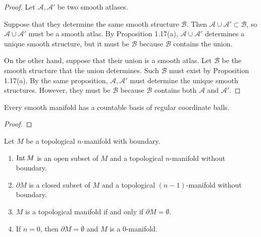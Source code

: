 \begin{proof}
  Let $\mathcal{A}, \mathcal{A}'$ be two smooth atlases.

  Suppose that they determine the same smooth structure $\mathcal{B}$.
  Then $\mathcal{A} \cup \mathcal{A}' \subset \mathcal{B}$, so $\mathcal{A} \cup \mathcal{A}'$ must be a smooth atlas.
  By Proposition 1.17(a), $\mathcal{A} \cup \mathcal{A}'$ determines a unique smooth structure, but it must be $\mathcal{B}$ because $\mathcal{B}$ contains the union.

  On the other hand, suppose that their union is a smooth atlas.
  Let $\mathcal{B}$ be the smooth structure that the union determines.
  Such $\mathcal{B}$ must exist by Proposition 1.17(a).
  By the same proposition, $\mathcal{A}, \mathcal{A}'$ must determine the unique smooth structures.
  However, they must be $\mathcal{B}$ because $\mathcal{B}$ contains both $\mathcal{A}$ and $\mathcal{A}'$.
\end{proof}

\begin{customexer}{1.20}
  Every smooth manifold has a countable basis of regular coordinate balls.
\end{customexer}

\begin{proof}
\end{proof}

\begin{customexer}{1.39}
  Let $M$ be a topological $n$-manifold with boundary.
  \begin{enumerate}[label=(\alph*)]
    \item
      $\operatorname{Int} M$ is an open subset of $M$ and a topological $n$-manifold without boundary.
    \item
      $\partial M$ is a closed subset of $M$ and a topological $(n - 1)$-manifold without boundary.
    \item
      $M$ is a topological manifold if and only if $\partial M = \emptyset$.
    \item
      If $n = 0$, then $\partial M = \emptyset$ and $M$ is a 0-manifold.
  \end{enumerate}
\end{customexer}

